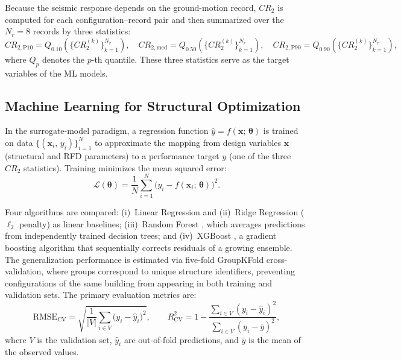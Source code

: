 \documentclass[preprint,12pt,authoryear]{elsarticle}
\newcommand{\CR}[1]{CR_{2,\text{#1}}}          %
\newcommand{\RMSE}{\mathrm{RMSE_{CV}}}
\newcommand{\Rsq}{R^{2}_{\mathrm{CV}}}
\begin{document}
Because the seismic response depends on the ground-motion record, $CR_2$ is
computed for each configuration--record pair and then summarized over the
$N_r = 8$ records by three statistics:
\begin{equation}
    \CR{P10} = Q_{0.10}\!\left(\{CR_2^{(k)}\}_{k=1}^{N_r}\right), \quad
    \CR{med} = Q_{0.50}\!\left(\{CR_2^{(k)}\}_{k=1}^{N_r}\right), \quad
    \CR{P90} = Q_{0.90}\!\left(\{CR_2^{(k)}\}_{k=1}^{N_r}\right),
    \label{eq:CR2stats}
\end{equation}
where $Q_p$ denotes the $p$-th quantile. These three statistics serve as the
target variables of the ML models.

\subsection{Machine Learning for Structural Optimization}
\label{sec:theory:ml}

In the surrogate-model paradigm, a regression function
$\hat{y} = f(\bm{x};\,\bm{\theta})$ is trained on data
$\{(\bm{x}_i,\,y_i)\}_{i=1}^{N}$ to approximate the mapping from design
variables $\bm{x}$ (structural and RFD parameters) to a performance target
$y$ (one of the three $CR_2$ statistics). Training minimizes the mean squared
error:
\begin{equation}
    \mathcal{L}(\bm{\theta}) = \frac{1}{N}\sum_{i=1}^{N}
    \bigl(y_i - f(\bm{x}_i;\,\bm{\theta})\bigr)^2.
    \label{eq:mse}
\end{equation}

Four algorithms are compared: (i)~Linear Regression and (ii)~Ridge
Regression ($\ell_2$ penalty) as linear baselines; (iii)~Random Forest
\citep{Breiman2001}, which averages predictions from independently trained
decision trees; and (iv)~XGBoost \citep{Chen2016}, a gradient boosting
algorithm that sequentially corrects residuals of a growing ensemble. The
generalization performance is estimated via five-fold GroupKFold
cross-validation, where groups correspond to unique structure identifiers,
preventing configurations of the same building from appearing in both
training and validation sets. The primary evaluation metrics are:
\begin{equation}
    \RMSE = \sqrt{\frac{1}{|V|}\sum_{i \in V}\bigl(y_i - \hat{y}_i\bigr)^2},
    \qquad
    \Rsq  = 1 - \frac{\sum_{i \in V}(y_i - \hat{y}_i)^2}
                      {\sum_{i \in V}(y_i - \bar{y})^2},
    \label{eq:metrics}
\end{equation}
where $V$ is the validation set, $\hat{y}_i$ are out-of-fold predictions, and
$\bar{y}$ is the mean of the observed values.
\end{document}

